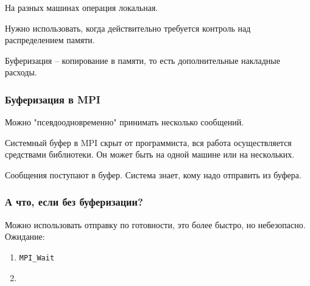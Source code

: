 \documentclass[main.tex]{subfiles}
\begin{document}
На разных машинах операция локальная.

Нужно использовать, когда действительно требуется контроль над распределением памяти.

Буферизация -- копирование в памяти, то есть дополнительные накладные расходы.

\subsubsection{Буферизация в MPI}

Можно "псевдоодновременно" принимать несколько сообщений.

Системный буфер в MPI скрыт от программиста, вся работа осуществляется средствами библиотеки.
Он может быть на одной машине или на нескольких.

Сообщения поступают в буфер.
Система знает, кому надо отправить из буфера. \\

\subsubsection{А что, если без буферизации?}

Можно использовать отправку по готовности, это более быстро, но небезопасно. \\

Ожидание:

\begin{enumerate}[noitemsep]
	\item \texttt{MPI\_Wait}
	\item \texttt{  }
\end{enumerate}
\end{document}
